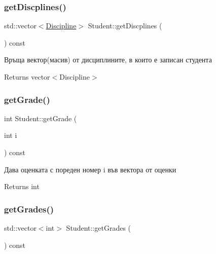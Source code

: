 \mbox{\label{class_student_a8a82196012942702fa9af422654cc614}} 
\subsubsection{\texorpdfstring{get\+Discplines()}{getDiscplines()}}
{\footnotesize\ttfamily std\+::vector$<$\hyperlink{class_discipline}{Discipline}$>$ Student\+::get\+Discplines (\begin{DoxyParamCaption}{ }\end{DoxyParamCaption}) const}



Връща вектор(масив) от дисциплините, в които е записан студента 

\begin{DoxyReturn}{Returns}
vector$<$\+Discipline$>$ 
\end{DoxyReturn}
\mbox{\label{class_student_a8dca8d440345a65b65da10319ecdf50b}} 
\subsubsection{\texorpdfstring{get\+Grade()}{getGrade()}}
{\footnotesize\ttfamily int Student\+::get\+Grade (\begin{DoxyParamCaption}\item[{int}]{i }\end{DoxyParamCaption}) const}



Дава оценката с пореден номер i във вектора от оценки 

\begin{DoxyReturn}{Returns}
int 
\end{DoxyReturn}
\mbox{\label{class_student_aeb25e6da52ead51103f0b3ee5e10953f}} 
\subsubsection{\texorpdfstring{get\+Grades()}{getGrades()}}
{\footnotesize\ttfamily std\+::vector$<$int$>$ Student\+::get\+Grades (\begin{DoxyParamCaption}{ }\end{DoxyParamCaption}) const}



